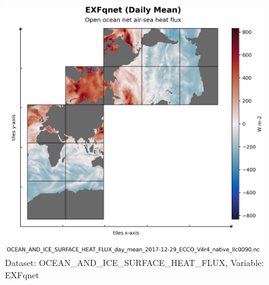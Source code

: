 \begin{figure}[H]
\centering
\includegraphics[scale=0.55]{../images/plots/native_plots/Ocean_and_Sea-Ice_Surface_Heat_Fluxes/EXFqnet.png}
\caption{Dataset: OCEAN\_AND\_ICE\_SURFACE\_HEAT\_FLUX, Variable: EXFqnet}
\label{tab:table-OCEAN_AND_ICE_SURFACE_HEAT_FLUX_EXFqnet-Plot}
\end{figure}
\pagebreak
